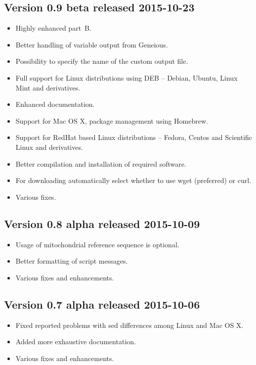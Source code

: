 \documentclass[a4paper, 11pt, twoside]{article}
\begin{document}
\subsection{Version 0.9 beta released 2015-10-23}

\begin{itemize}
  \item Highly enhanced part~B.
  \item Better handling of variable output from Geneious.
  \item Possibility to specify the name of the custom output file.
  \item Full support for Linux distributions using DEB -- Debian, Ubuntu, Linux Mint and derivatives.
  \item Enhanced documentation.
  \item Support for Mac OS X, package management using Homebrew.
  \item Support for RedHat based Linux distributions -- Fedora, Centos and Scientific Linux and derivatives.
  \item Better compilation and installation of required software.
  \item For downloading automatically select whether to use wget (preferred) or curl.
  \item Various fixes.
\end{itemize}

\subsection{Version 0.8 alpha released 2015-10-09}

\begin{itemize}
  \item Usage of mitochondrial reference sequence is optional.
  \item Better formatting of script messages.
  \item Various fixes and enhancements.
\end{itemize}

\subsection{Version 0.7 alpha released 2015-10-06}

\begin{itemize}
  \item Fixed reported problems with sed differences among Linux and Mac OS X.
  \item Added more exhaustive documentation.
  \item Various fixes and enhancements.
\end{itemize}
\end{document}
